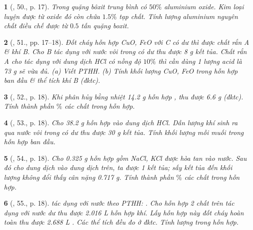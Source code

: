 \documentclass{article}
\newtheorem{baitoan}{}
\begin{document}
\begin{baitoan}[\cite{An_400_BT_Hoa_Hoc_9}, 50., p. 17]
	Trong quặng bôxit trung bình có $50\%$ aluminium oxide. Kim loại luyện được từ oxide đó còn chứa $1.5\%$ tạp chất. Tính lượng aluminium nguyên chất điều chế được  từ $0.5$ tấn quặng boxit.
\end{baitoan}

\begin{baitoan}[\cite{An_400_BT_Hoa_Hoc_9}, 51., pp. 17--18]
	Đốt cháy hỗn hợp {\rm CuO, FeO} với {\rm C} có dư thì được chất rắn A \& khí B. Cho B tác dụng với nước vôi trong có dư thu được {\rm8 g} kết tủa. Chất rắn A cho tác dụng với dung dịch {\rm HCl} có nồng độ $10\%$ thì cần dùng 1 lượng acid là {\rm73 g} sẽ vừa đủ. (a) Viết {\rm PTHH}. (b) Tính khối lượng {\rm CuO, FeO} trong hỗn hợp ban đầu \& thể tích khí B (đktc).
\end{baitoan}

\begin{baitoan}[\cite{An_400_BT_Hoa_Hoc_9}, 52., p. 18]
	Khi phân hủy bằng nhiệt {\rm14.2 g} hỗn hợp {\rm{}}, thu được {\rm6.6 g } (đktc). Tính thành phần $\%$ các chất trong hỗn hợp.
\end{baitoan}

\begin{baitoan}[\cite{An_400_BT_Hoa_Hoc_9}, 53., p. 18]
	Cho {\rm38.2 g} hỗn hợp {\rm{}} vào dung dịch {\rm HCl}. Dẫn lượng khí sinh ra qua nước vôi trong có dư thu được {\rm30 g} kết tủa. Tính khối lượng mỗi muối trong hỗn hợp ban đầu.
\end{baitoan}

\begin{baitoan}[\cite{An_400_BT_Hoa_Hoc_9}, 54., p. 18]
	Cho {\rm0.325 g} hỗn hợp gồm {\rm NaCl, KCl} được hòa tan vào nước. Sau đó cho dung dịch {\rm{}} vào dung dịch trên, ta được 1 kết tủa; sấy kết tủa đến khối lượng không đổi thấy cân nặng {\rm0.717 g}. Tính thành phần $\%$ các chất trong hỗn hợp.
\end{baitoan}

\begin{baitoan}[\cite{An_400_BT_Hoa_Hoc_9}, 55., p. 18]
	{\rm{}} tác dụng với nước theo {\rm PTHH: }. Cho hỗn hợp 2 chất trên tác dụng với nước dư thu được {\rm2.016 L} hỗn hợp khí. Lấy hỗn hợp này đốt cháy hoàn toàn thu được {\rm2.688 L }. Các thể tích đều đo ở đktc. Tính lượng {\rm{}} trong hỗn hợp.
\end{baitoan}
\end{document}
